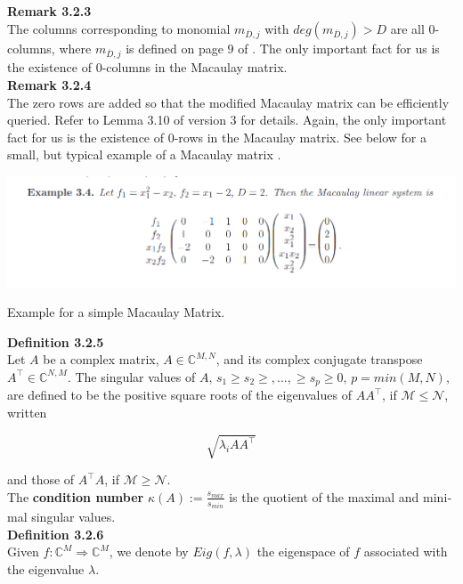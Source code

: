 \documentclass[a4paper,11pt]{article}
\begin{document}
\begin{otherlanguage}{english}
\noindent
\textbf{Remark 3.2.3} \\
The columns corresponding to monomial $m_{\overline{D},j}$ with $deg(m_{\overline{D},j}) > D$ are all $0$-columns, where $m_{\overline{D},j}$ is defined on page $9$ of \cite{QAA}. The only important fact for us is the existence of $0$-columns in the Macaulay matrix. \\

\noindent
\textbf{Remark 3.2.4} \\
The zero rows are added so that the modified Macaulay matrix can be efficiently queried. Refer to Lemma 3.10 of \cite{QAA} version 3 for details. Again, the only important fact for us is the existence of $0$-rows in the Macaulay matrix. 
See below for a small, but typical example of a Macaulay matrix \cite{BDM}. \\

\begin{figurehere}
  \centering
  \includegraphics[width=14cm]{Macaulay.png}
  \caption{Example for a simple Macaulay Matrix.\label{abb_1}}
\end{figurehere}
\vspace{0.3cm}

\noindent
\textbf{Definition 3.2.5} \\
Let $A$ be a complex matrix, $A \in \mathbb{C}^{M,N}$, and its complex conjugate transpose $A^\intercal \in \mathbb{C}^{N,M}$. The singular values of $A, \, s_1 \geq s_2 \geq,...,\geq s_p \geq 0, \, p = min(M,N)$, are defined to be the positive square roots of the eigenvalues of $AA^\intercal$, if $\mathcal{M} \leq \mathcal{N}$, written

$$\sqrt{\lambda_i AA^\intercal}$$

\noindent
and those of $A^\intercal A$, if $\mathcal{M} \geq \mathcal{N}$. \\

\noindent
The \textbf{condition number} $\kappa(A) := \frac{s_{max}}{s_{min}}$ is the quotient of the maximal and minimal singular values. \\

\noindent
\textbf{Definition 3.2.6} \\
Given $f: \mathbb{C}^M \Rightarrow \mathbb{C}^M$, we denote by $Eig(f,\lambda)$ the eigenspace of $f$ associated with the eigenvalue $\lambda$. \\


\end{otherlanguage}
\end{document}
